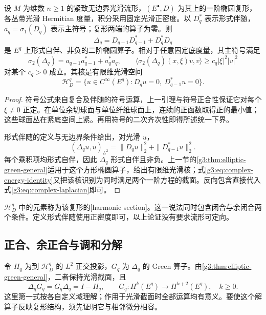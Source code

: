 \begin{proposition}\label{g3:prop:elliptic-complex-laplacians}
	设 \(M\) 为维数 \(n\ge1\) 的紧致无边界光滑流形，\((E^\bullet,D)\) 为其上的一阶椭圆复形，各丛带光滑 Hermitian 度量，积分采用固定光滑正密度。以 \(D_q^*\) 表示形式伴随，\(a_q=\sigma_1(D_q)\) 表示主符号；复形两端的算子为零。则
	\begin{equation}\label{g3:eq:complex-laplacian}
		\Delta_q=D_{q-1}D_{q-1}^*+D_q^*D_q
	\end{equation}
	是 \(E^q\) 上形式自伴、非负的二阶椭圆算子。相对于任意固定底度量，其主符号满足
	\[
		\sigma_2(\Delta_q)=a_{q-1}a_{q-1}^*+a_q^*a_q,
		\qquad
		\langle\sigma_2(\Delta_q)(x,\xi)v,v\rangle
		\ge c_q|\xi|^2|v|^2
	\]
	对某个 \(c_q>0\) 成立。其核是有限维光滑空间
	\[
		\mathcal H_D^q
		=\{u\in C^\infty(E^q):D_qu=0,\ D_{q-1}^*u=0\}.
	\]
\end{proposition}
\begin{proof}
	符号公式来自复合及伴随的符号运算，上一引理与符号正合性保证它对每个 \(\xi\ne0\) 正定。在单位余切球面与单位纤维球面上，连续的正函数取得正的最小值；这些球面丛在紧底空间上紧。再用符号的二次齐次性即得所述统一下界。

	形式伴随的定义与无边界条件给出，对光滑 \(u\)，
	\begin{equation}\label{g3:eq:complex-energy-identity}
		(\Delta_qu,u)_{L^2}
		=\|D_qu\|_2^2+\|D_{q-1}^*u\|_2^2.
	\end{equation}
	每个乘积项均形式自伴，因此 \(\Delta_q\) 形式自伴且非负。上一节的\cref{g3:thm:elliptic-green-general}适用于这个方形椭圆算子，给出有限维光滑核；式\eqref{g3:eq:complex-energy-identity}又把该核识别为同时满足两个一阶方程的截面。反向包含直接代入式\eqref{g3:eq:complex-laplacian}即可。
\end{proof}

\(\mathcal H_D^q\) 中的元素称为该复形的[harmonic section]。这一说法同时包含闭合与余闭合两个条件。定义形式伴随使用正密度即可，以上论证没有要求流形可定向。

\subsection{正合、余正合与调和分解}
\label{g3:subsec:1304:03}
令 \(H_q\) 为到 \(\mathcal H_D^q\) 的 \(L^2\) 正交投影，\(G_q\) 为 \(\Delta_q\) 的 Green 算子。由\cref{g3:thm:elliptic-green-general}，二者保持光滑截面，且
\[
	\Delta_qG_q=G_q\Delta_q=I-H_q,\qquad
	G_q:H^k(E^q)\longrightarrow H^{k+2}(E^q),\quad k\ge0.
\]
这里第一式按各自定义域理解；作用于光滑截面时全部运算均有意义。要使这个解算子反映复形结构，须先证明它与相邻微分相容。

